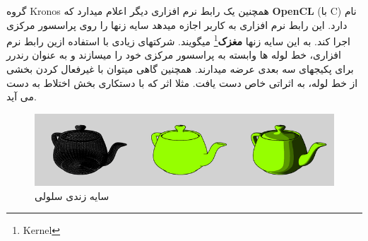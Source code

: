 \documentclass[14pt,a4paper]{memoir}
\begin{document}
	 
	 گروه Kronos همچنین یک رابط نرم افزاری دیگر اعلام میدارد که \textbf{OpenCL}  (با C) نام دارد. این رابط نرم افزاری به کاربر اجازه میدهد سایه زنها را روی پراسسور مرکزی اجرا کند. به این سایه زنها \textbf{مغزک}\footnote{Kernel} میگویند. شرکتهای زیادی با استفاده ازین رابط نرم افزاری، خط لوله ها وابسته به پراسسور مرکزی خود را میسازند و به عنوان رندرر برای پکیجهای سه بعدی عرضه میدارند. همچنین گاهی میتوان با غیرفعال کردن بخشی از خط لوله، به اثراتی خاص دست یافت. مثلا اثر  که با دستکاری بخش اختلاط به دست می آید.
	 
	\begin{figure}[H]
		\centering
		\includegraphics[scale=0.3]{Cel}
		\caption{سایه زندی سلولی}
	\end{figure}
	 
	 
	 
	 
	 
	 
	 
	 
	 
	 
	 
	 
	 
	 
	 
	 
	 
	 
\end{document}
